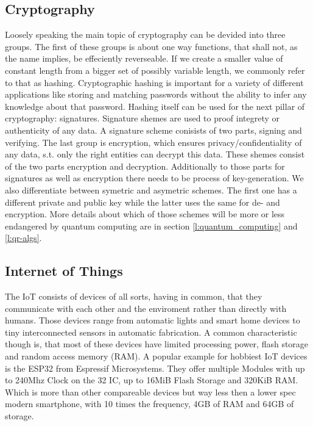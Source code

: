 \documentclass[conference]{IEEEtran}
\newcommand{\comment}[1]{}
\begin{document}
\subsection{Cryptography}
Loosely speaking the main topic of cryptography can be devided into three groups.
The first of these groups is about one way functions, that shall not, as the name implies, be effeciently reverseable.
If we create a smaller value of constant length from a bigger set of possibly variable length, we commonly refer to that as hashing.
Cryptographic hashing is important for a variety of different applications like storing and matching passwords without the ability to infer any knowledge about that password.
Hashing itself can be used for the next pillar of cryptography: signatures.
Signature shemes are used to proof integrety or authenticity of any data.
A signature scheme conisists of two parts, signing and verifying. 
The last group is encryption, which ensures privacy/confidentiality of any data, s.t. only the right entities can decrypt this data.
These shemes consist of the two parts encryption and decryption.
Additionally to those parts for signatures as well as encryption there needs to be process of key-generation.
We also differentiate between symetric and asymetric schemes. The first one has a different private and public key while the latter uses the same for de- and encryption.
More details about which of those schemes will be more or less endangered by quantum computing are in section \ref{l:quantum_computing} and \ref{l:qr-algs}.

\subsection{Internet of Things}
\comment{ %
- growing: over 3 billion rn \cite{QR_IoT}
} %

The IoT consists of devices of all sorts, having in common, that they communicate with each other and the enviroment rather than directly with humans.
Those devices range from automatic lights and smart home devices to tiny interconnected sensors in automatic fabrication.
A common characteristic though is, that most of these devices have limited processing power, flash storage and random access memory (RAM). 
A popular example for hobbiest IoT devices is the ESP32 from Espressif Microsystems.
They offer multiple Modules with up to 240Mhz Clock on the 32 IC, up to 16MiB Flash Storage and 320KiB RAM.
Which is more than other compareable devices but way less then a lower spec modern smartphone, with 10 times the frequency, 4GB of RAM and 64GB of storage.
\end{document}
